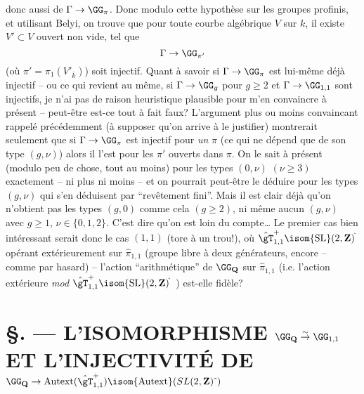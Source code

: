 donc aussi de $\Gamma\to\GG_{\pi}$.  Donc modulo
cette hypothèse sur les groupes profinis, et utilisant
Belyi, on trouve que pour toute courbe algébrique $V$ sur $k$, 
il existe $V'\subset  V$ ouvert non vide, tel que
$$\Gamma\to\GG_{\pi'}$$
(où $\pi'=\pi_1(V'_{\bar k})$) soit injectif.  Quant à
savoir si $\Gamma\to\GG_{\pi}$ est lui-même déjà
injectif -- ou ce qui revient au même, si $\Gamma\to
\GG_g$ pour $g\ge 2$ et $\Gamma\to\GG_{1,1}$ sont
injectifs, je n'ai pas de raison heuristique plausible pour
m'en convaincre à présent -- peut-être est-ce tout à
fait faux?  L'argument plus ou moins convaincant rappelé
précédemment (à supposer qu'on arrive à le justifier)
montrerait seulement que si $\Gamma\to\GG_\pi$
est injectif pour {\it un} $\pi$ (ce qui ne dépend que 
de son type $(g,\nu)$) alors il l'est pour les $\pi'$
ouverts dans $\pi$.  On le sait à
présent (modulo peu de chose, tout au moins) pour les types
$(0,\nu)$ $(\nu\ge 3)$ exactement -- ni plus ni moins -- et
on pourrait peut-être le déduire pour les types $(g,\nu)$
qui s'en déduisent par ``revêtement fini''.  Mais il est
clair déjà qu'on n'obtient pas les types $(g,0)$ comme
cela $(g\ge 2)$, ni même aucun $(g,\nu)$ avec $g\ge 1$,
$\nu\in\{0,1,2\}$.  C'est dire qu'on est loin du compte\dots
Le premier cas bien intéressant serait donc le cas $(1,1)$
(tore à un trou!), où $\hat\gT^+_{1,1} \isom  
{\rm SL}(2,{\mathbf{Z}})^{\hat{}}$ opérant extérieurement sur
$\hat\pi_{1,1}$ (groupe libre à deux générateurs, encore
-- comme par hasard) -- l'action ``arithmétique'' de $\GG_{\mathbf{Q}}$ 
sur $\hat\pi_{1,1}$ (i.e. l'action extérieure {\it mod} 
$\hat\gT^+_{1,1} \isom {\rm SL}(2,{\mathbf{Z}})^{\hat{}}$\ ) est-elle fidèle?














\chapter*{\S {}. --- L'ISOMORPHISME $\GG_\mathbf{Q}\buildrel\sim\over\to
\GG_{1,1}$ ET L'INJECTIVITÉ DE $\GG_\mathbf{Q}\to {\rm Autext}(\hat\gT_{1,1}^+)
 \isom  {\rm Autext}(SL(2,\mathbf{Z})\,\hat{}\,)$}\thispagestyle{empty}
\label{sec:36}
